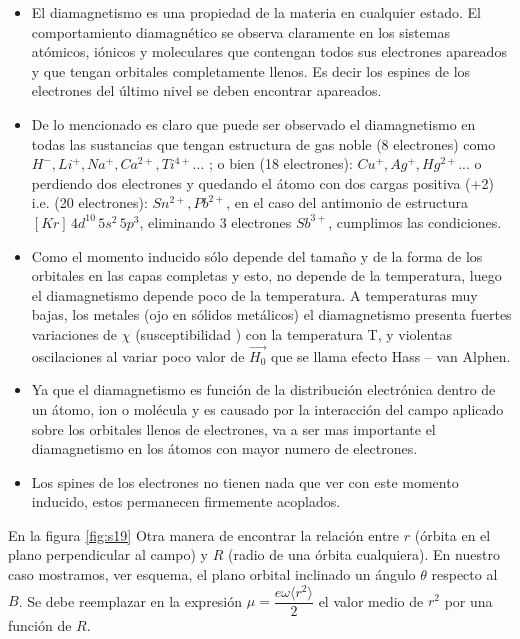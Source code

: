 \begin{itemize}
	\item El diamagnetismo es una propiedad de la materia en cualquier estado. El comportamiento diamagnético se observa claramente en los sistemas atómicos, iónicos y moleculares que contengan todos sus electrones apareados y que tengan orbitales completamente llenos. Es decir los espines de los electrones del último nivel se deben encontrar apareados.

	\item De lo mencionado es claro que puede ser observado el diamagnetismo en todas las sustancias que tengan estructura de gas noble (8 electrones) como $H^{-}, Li^{+}, Na^{+}, Ca^{2+}, Ti^{4+}$... ; o bien (18 electrones): $Cu^{+}, Ag^{+}, Hg^{2+}$... o perdiendo dos electrones y quedando el átomo con dos cargas positiva (+2) i.e. (20 electrones): $Sn^{2+}, Pb^{2+}$, en el caso del antimonio de estructura $[Kr]\, 4d^{10}\, 5s^{2}\, 5p^{3}$, eliminando 3 electrones $Sb^{3+}$, cumplimos las condiciones.
	
	\item Como el momento inducido sólo depende del tamaño y de la forma de los orbitales en las capas completas y esto, no depende de la temperatura, luego el diamagnetismo depende poco de la temperatura. A temperaturas muy bajas, los metales (ojo en sólidos metálicos) el diamagnetismo presenta fuertes variaciones de $\chi$ (susceptibilidad ) con la temperatura T, y violentas oscilaciones al variar poco valor de $\overrightarrow{H_{0}}$ que se llama efecto Hass – van Alphen.

	\item Ya que el diamagnetismo es función de la distribución electrónica dentro de un átomo, ion o molécula y es causado por la interacción del campo aplicado sobre los orbitales llenos de electrones, va a ser mas importante el diamagnetismo en los átomos con mayor numero de electrones.

	\item Los spines de los electrones no tienen nada que ver con este momento inducido, estos permanecen firmemente acoplados.
\end{itemize}

En la figura \ref{fig:s19} Otra manera de encontrar la relación entre $r$ (órbita en el plano perpendicular al campo) y $R$ (radio de una órbita cualquiera). En nuestro caso mostramos, ver esquema, el plano orbital inclinado un ángulo $\theta$ respecto al $B$. Se debe reemplazar en la expresión $\mu=\dfrac{e\omega \langle r^{2} \rangle}{2}$ el valor medio de $r^{2}$ por una función de $R$.

